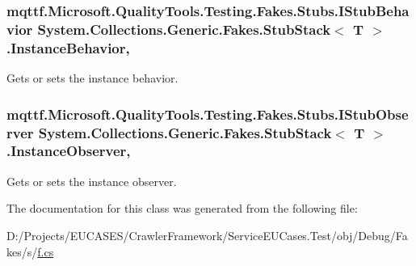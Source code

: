 \hypertarget{class_system_1_1_collections_1_1_generic_1_1_fakes_1_1_stub_stack_3_01_t_01_4_a2fb34c5256153fb292ef8a0e85f8927c}{
\subsubsection[{Instance\-Behavior}]{\setlength{\rightskip}{0pt plus 5cm}mqttf.\-Microsoft.\-Quality\-Tools.\-Testing.\-Fakes.\-Stubs.\-I\-Stub\-Behavior System.\-Collections.\-Generic.\-Fakes.\-Stub\-Stack$<$ T $>$.Instance\-Behavior\hspace{0.3cm}{\ttfamily [get]}, {\ttfamily [set]}}}\label{class_system_1_1_collections_1_1_generic_1_1_fakes_1_1_stub_stack_3_01_t_01_4_a2fb34c5256153fb292ef8a0e85f8927c}


Gets or sets the instance behavior.

\hypertarget{class_system_1_1_collections_1_1_generic_1_1_fakes_1_1_stub_stack_3_01_t_01_4_a4b5588099cc15559be0e41574681e384}{
\subsubsection[{Instance\-Observer}]{\setlength{\rightskip}{0pt plus 5cm}mqttf.\-Microsoft.\-Quality\-Tools.\-Testing.\-Fakes.\-Stubs.\-I\-Stub\-Observer System.\-Collections.\-Generic.\-Fakes.\-Stub\-Stack$<$ T $>$.Instance\-Observer\hspace{0.3cm}{\ttfamily [get]}, {\ttfamily [set]}}}\label{class_system_1_1_collections_1_1_generic_1_1_fakes_1_1_stub_stack_3_01_t_01_4_a4b5588099cc15559be0e41574681e384}


Gets or sets the instance observer.



The documentation for this class was generated from the following file\-:\begin{DoxyCompactItemize}
\item 
D\-:/\-Projects/\-E\-U\-C\-A\-S\-E\-S/\-Crawler\-Framework/\-Service\-E\-U\-Cases.\-Test/obj/\-Debug/\-Fakes/s/\hyperlink{s_2f_8cs}{f.\-cs}\end{DoxyCompactItemize}

